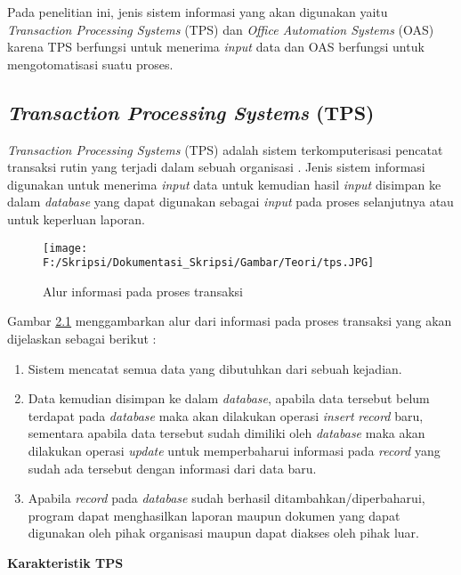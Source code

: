 	Pada penelitian ini, jenis sistem informasi yang akan digunakan yaitu \textit{Transaction Processing Systems} (TPS) dan \textit{Office Automation Systems} (OAS) karena TPS berfungsi untuk menerima \textit{input} data dan OAS berfungsi untuk mengotomatisasi suatu proses.

\subsection{\textit{Transaction Processing Systems} (TPS)}
\label{sec:tps}
\textit{Transaction Processing Systems} (TPS) adalah sistem terkomputerisasi pencatat transaksi rutin yang terjadi dalam sebuah organisasi \cite{Laudon:1996}. Jenis sistem informasi digunakan untuk menerima \textit{input} data untuk kemudian hasil \textit{input} disimpan ke dalam \textit{database} yang dapat digunakan sebagai \textit{input} pada proses selanjutnya atau untuk keperluan laporan.

\begin{figure}[H]
	\centering
		\texttt{[image: F:/Skripsi/Dokumentasi\_Skripsi/Gambar/Teori/tps.JPG]}
		{\caption{Alur informasi pada proses transaksi} \cite{Turban:2001}}
	\label{fig:tps}
\end{figure}

Gambar \hyperlink{tps}{2.1} menggambarkan alur dari informasi pada proses transaksi yang akan dijelaskan sebagai berikut : 
\begin{enumerate}
	\item Sistem mencatat semua data yang dibutuhkan dari sebuah kejadian.
	\item Data kemudian disimpan ke dalam \textit{database}, apabila data tersebut belum terdapat pada \textit{database} maka akan dilakukan operasi \textit{insert} \textit{record} baru, sementara apabila data tersebut sudah dimiliki oleh \textit{database} maka akan dilakukan operasi \textit{update} untuk memperbaharui informasi pada \textit{record} yang sudah ada tersebut dengan informasi dari data baru.
	\item Apabila \textit{record} pada \textit{database} sudah berhasil ditambahkan/diperbaharui, program dapat menghasilkan laporan maupun dokumen yang dapat digunakan oleh pihak organisasi maupun dapat diakses oleh pihak luar.
\end{enumerate}

\textbf{Karakteristik TPS}\\
\label{sec:karakteristik_tps}

